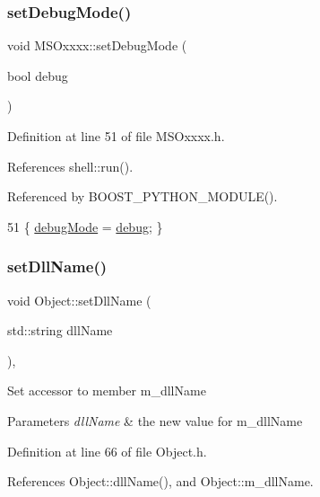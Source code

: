 \subsubsection{\texorpdfstring{set\+Debug\+Mode()}{setDebugMode()}}
{\footnotesize\ttfamily void M\+S\+Oxxxx\+::set\+Debug\+Mode (\begin{DoxyParamCaption}\item[{bool}]{debug }\end{DoxyParamCaption})\hspace{0.3cm}{\ttfamily [inline]}}



Definition at line 51 of file M\+S\+Oxxxx.\+h.



References shell\+::run().



Referenced by B\+O\+O\+S\+T\+\_\+\+P\+Y\+T\+H\+O\+N\+\_\+\+M\+O\+D\+U\+L\+E().


\begin{DoxyCode}
51 \{       \hyperlink{classMSOxxxx_a826ba82e93bbe5780169107a31dbfd29}{debugMode} = \hyperlink{classObject_aac010553f022165573714b7014a15f0d}{debug};        \}
\end{DoxyCode}
\mbox{\label{classObject_a870c5af919958c2136623b2d7816d123}} 
\subsubsection{\texorpdfstring{set\+Dll\+Name()}{setDllName()}}
{\footnotesize\ttfamily void Object\+::set\+Dll\+Name (\begin{DoxyParamCaption}\item[{std\+::string}]{dll\+Name }\end{DoxyParamCaption})\hspace{0.3cm}{\ttfamily [inline]}, {\ttfamily [inherited]}}

Set accessor to member m\+\_\+dll\+Name 
\begin{DoxyParams}{Parameters}
{\em dll\+Name} & the new value for m\+\_\+dll\+Name \\
\hline
\end{DoxyParams}


Definition at line 66 of file Object.\+h.



References Object\+::dll\+Name(), and Object\+::m\+\_\+dll\+Name.



